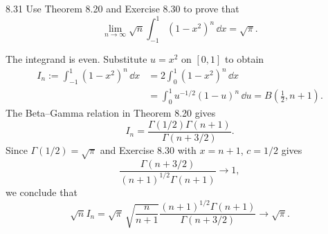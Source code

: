 \documentclass[11pt, oneside]{article}
\begin{document}
\begin{exercise}{8.31}
Use Theorem 8.20 and Exercise 8.30 to prove that
\[
 \lim_{n\to\infty}\sqrt n\int_{-1}^1(1-x^2)^n\,\dd x=\sqrt\pi.
\]
\end{exercise}
\begin{solution}
The integrand is even. Substitute $u=x^2$ on $[0, 1]$ to obtain
\[
 \begin{aligned}
 I_n:=\int_{-1}^1(1-x^2)^n\,\dd x
 &=2\int_0^1(1-x^2)^n\,\dd x\\
 &=\int_0^1u^{-1/2}(1-u)^n\,\dd u
 =B\left(\frac12, n+1\right).
 \end{aligned}
\]
The Beta--Gamma relation in Theorem 8.20 gives
\[
 I_n=\frac{\Gamma(1/2)\Gamma(n+1)}{\Gamma(n+3/2)}.
\]
Since $\Gamma(1/2)=\sqrt\pi$ and Exercise 8.30 with $x=n+1$, $c=1/2$ gives
\[
 \frac{\Gamma(n+3/2)}{(n+1)^{1/2}\Gamma(n+1)}\longrightarrow1,
\]
we conclude that
\[
 \sqrt n I_n
 =\sqrt\pi\,\sqrt{\frac n{n+1}}
 \frac{(n+1)^{1/2}\Gamma(n+1)}{\Gamma(n+3/2)}
 \longrightarrow\sqrt\pi.
\]
\end{solution}
\end{document}
